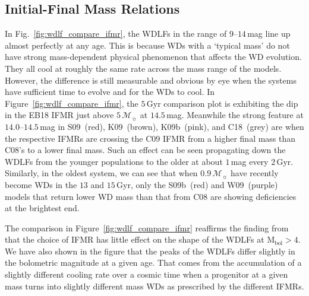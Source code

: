 \documentclass[fleqn,usenatbib]{rasti}
\newcommand{\msun}{\mathcal{M}_{\sun}}
\begin{document}
\subsection{Initial-Final Mass Relations}
In Fig.~\ref{fig:wdlf_compare_ifmr}, the WDLFs in the range of $9$--$14$\,mag
line up almost perfectly at any age. This is because WDs with a `typical mass'
do not have strong mass-dependent physical phenomenon that affects the WD
evolution. They all cool at roughly the same rate across the mass range of the
models. However, the difference is still measurable and obvious by eye when
the systems have sufficient time to evolve and for the WDs to cool. In 
Figure~\ref{fig:wdlf_compare_ifmr}, the $5$\,Gyr comparison plot is exhibiting
the dip in the EB18 IFMR just above $5\,\msun$ at $14.5$\,mag. Meanwhile the strong
feature at $14.0$--$14.5$\,mag in S09~(red), K09~(brown), K09b~(pink), and
C18~(grey) are when the respective IFMRs are crossing the C09 IFMR from a higher
final mass than C08's to a lower final mass. Such an effect can be seen propagating
down the WDLFs from the younger populations to the older at about $1$\,mag every
$2$\,Gyr. Similarly, in the oldest system, we can see that when $0.9\,\msun$
have recently become WDs in the $13$ and $15$\,Gyr, only the S09b~(red) and
W09~(purple) models that return lower WD mass than that from C08 are showing
deficiencies at the brightest end. 

The comparison in Figure~\ref{fig:wdlf_compare_ifmr} reaffirms
the finding from \citet{2008MNRAS.387.1693C} that
the choice of IFMR has little effect on the
shape of the WDLFs at $\mathrm{M}_{\mathrm{bol}}>4$.
We have also shown in the figure that the peaks of the WDLFs differ slightly
in the bolometric magnitude at a given age. That comes from the
accumulation of a slightly different cooling rate over a cosmic time when a
progenitor at a given mass turns into slightly different mass WDs as prescribed
by the different IFMRs.
 
\end{document}
